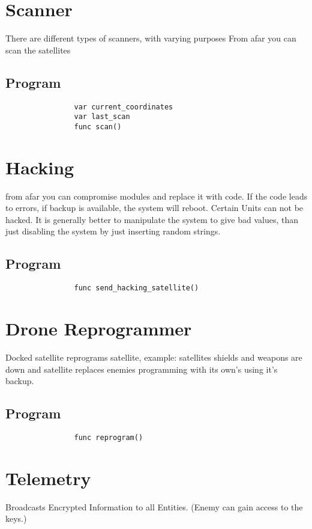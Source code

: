 \documentclass[a4paper]{scrreprt}
\begin{document}
    \section{Scanner}
        There are different types of scanners, with varying purposes
        From afar you can scan the satellites 
        \subsection{Program}
            \begin{verbatim}
                var current_coordinates
                var last_scan
                func scan()
            \end{verbatim}
    \section{Hacking}
        from afar you can compromise modules and replace it with code.
        If the code leads to errors, if backup is available, the system will reboot.
        Certain Units can not be hacked.
        It is generally better to manipulate the system to give bad values, than just disabling the system by just inserting random strings.
        \subsection{Program}
            \begin{verbatim}
                func send_hacking_satellite()
            \end{verbatim}
    \section{Drone Reprogrammer}
        Docked satellite reprograms satellite, example: satellites shields and weapons are down and satellite replaces enemies programming with its own's using it's backup.
        \subsection{Program}
            \begin{verbatim}
                func reprogram()
            \end{verbatim}
    \section{Telemetry}
        Broadcasts Encrypted Information to all Entities. (Enemy can gain access to the keys.)
\end{document}
